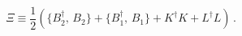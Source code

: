 \begin{equation}
 \Xi \equiv \frac{1}{2}\left( \{ B_2^{\dagger},\,B_2\} +
\{ B_1^{\dagger},\,B_1\} +K^{\dagger}K +L^{\dagger}L\right)\,.
\label{eq:4.0.8}
\end{equation}

